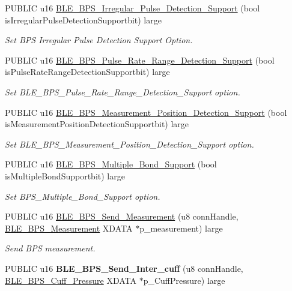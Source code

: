 \begin{DoxyCompactItemize}
P\+U\+B\+L\+IC u16 \hyperlink{group___b_l_e___b_p_s_ga425c3cf06c7419a4e9596daa31c039c2}{B\+L\+E\+\_\+\+B\+P\+S\+\_\+\+Irregular\+\_\+\+Pulse\+\_\+\+Detection\+\_\+\+Support} (bool is\+Irregular\+Pulse\+Detection\+Supportbit) large
\begin{DoxyCompactList}\small\item\em Set B\+PS Irregular Pulse Detection Support Option. \end{DoxyCompactList}\item 
P\+U\+B\+L\+IC u16 \hyperlink{group___b_l_e___b_p_s_ga88a9d331b3b42b5ec3875e4ca8bdb352}{B\+L\+E\+\_\+\+B\+P\+S\+\_\+\+Pulse\+\_\+\+Rate\+\_\+\+Range\+\_\+\+Detection\+\_\+\+Support} (bool is\+Pulse\+Rate\+Range\+Detection\+Supportbit) large
\begin{DoxyCompactList}\small\item\em Set B\+L\+E\+\_\+\+B\+P\+S\+\_\+\+Pulse\+\_\+\+Rate\+\_\+\+Range\+\_\+\+Detection\+\_\+\+Support option. \end{DoxyCompactList}\item 
P\+U\+B\+L\+IC u16 \hyperlink{group___b_l_e___b_p_s_ga6e474cf2b15bba4651ea4ef9cd78d717}{B\+L\+E\+\_\+\+B\+P\+S\+\_\+\+Measurement\+\_\+\+Position\+\_\+\+Detection\+\_\+\+Support} (bool is\+Measurement\+Position\+Detection\+Supportbit) large
\begin{DoxyCompactList}\small\item\em Set B\+L\+E\+\_\+\+B\+P\+S\+\_\+\+Measurement\+\_\+\+Position\+\_\+\+Detection\+\_\+\+Support option. \end{DoxyCompactList}\item 
P\+U\+B\+L\+IC u16 \hyperlink{group___b_l_e___b_p_s_ga0930340def72eab5d0a9afbceed67163}{B\+L\+E\+\_\+\+B\+P\+S\+\_\+\+Multiple\+\_\+\+Bond\+\_\+\+Support} (bool is\+Multiple\+Bond\+Supportbit) large
\begin{DoxyCompactList}\small\item\em Set B\+P\+S\+\_\+\+Multiple\+\_\+\+Bond\+\_\+\+Support option. \end{DoxyCompactList}\item 
P\+U\+B\+L\+IC u16 \hyperlink{group___b_l_e___b_p_s_ga0c76f1c654643f9c57824f3135ef1c32}{B\+L\+E\+\_\+\+B\+P\+S\+\_\+\+Send\+\_\+\+Measurement} (u8 conn\+Handle, \hyperlink{struct_b_l_e___b_p_s___measurement}{B\+L\+E\+\_\+\+B\+P\+S\+\_\+\+Measurement} X\+D\+A\+TA $\ast$p\+\_\+measurement) large
\begin{DoxyCompactList}\small\item\em Send B\+PS measurement. \end{DoxyCompactList}\item 
P\+U\+B\+L\+IC u16 {\bfseries B\+L\+E\+\_\+\+B\+P\+S\+\_\+\+Send\+\_\+\+Inter\+\_\+cuff} (u8 conn\+Handle, \hyperlink{struct_b_l_e___b_p_s___cuff___pressure}{B\+L\+E\+\_\+\+B\+P\+S\+\_\+\+Cuff\+\_\+\+Pressure} X\+D\+A\+TA $\ast$p\+\_\+\+Cuff\+Pressure) large\hypertarget{group___b_l_e___b_p_s_ga13e00a1e214c25403b199c04e69e1339}{}\label{group___b_l_e___b_p_s_ga13e00a1e214c25403b199c04e69e1339}

\end{DoxyCompactItemize}


